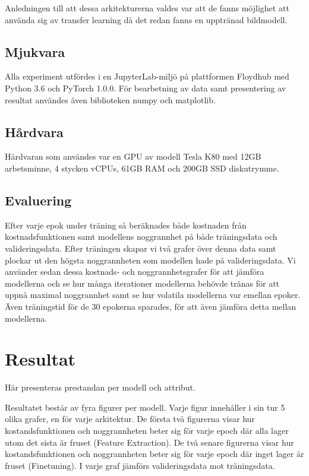 \documentclass[]{kththesis}
\begin{document}
Anledningen till att dessa arkitekturerna valdes var att de fanns möjlighet att använda sig av transfer learning då det redan fanns en upptränad bildmodell.

\section{Mjukvara}
Alla experiment utfördes i en JupyterLab-miljö på plattformen Floydhub \parencite{floydhub} med Python 3.6 och PyTorch 1.0.0. För bearbetning av data samt presentering av resultat användes även biblioteken numpy och matplotlib.

\section{Hårdvara}
Hårdvaran som användes var en GPU av modell Tesla K80 med 12GB arbetsminne, 4 stycken vCPUs, 61GB RAM och 200GB SSD diskutrymme.

\section{Evaluering}
Efter varje epok under träning så beräknades både kostnaden från kostnadsfunktionen samt modellens noggrannhet på både träningsdata och valideringsdata. Efter träningen skapar vi två grafer över denna data samt plockar ut den högsta noggrannheten som modellen hade på valideringsdata. Vi använder sedan dessa kostnads- och noggrannhetsgrafer för att jämföra modellerna och se hur många iterationer modellerna behövde tränas för att uppnå maximal noggrannhet samt se hur volatila modellerna var emellan epoker. Även träningstid för de 30 epokerna sparades, för att även jämföra detta mellan modellerna.

\chapter{Resultat}
Här presenteras prestandan per modell och attribut.

Resultatet består av fyra figurer per modell. 
Varje figur innehåller i sin tur 5 olika grafer, en för varje arkitektur.
De första två figurerna visar hur kostandsfunktionen och noggrannheten beter sig för varje epoch där alla lager utom det sista är fruset (Feature Extraction).
De två senare figurerna visar hur kostandsfunktionen och noggrannheten beter sig för varje epoch där inget lager är fruset (Finetuning).
I varje graf jämförs valideringsdata mot träningsdata.
\end{document}
